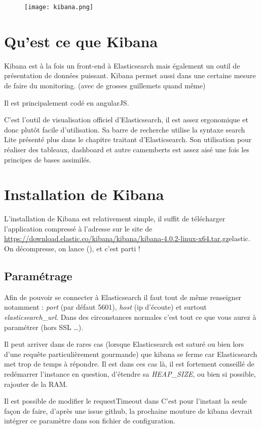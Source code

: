 \begin{figure}[H]
\center
\texttt{[image: kibana.png]}
\label{fig:kibana.png}
\end{figure}
\section{Qu'est ce que Kibana}
Kibana est à la fois un front-end à Elasticsearch mais également un outil de présentation
de données puissant. Kibana permet aussi dans une certaine mesure de faire du monitoring.
(avec de grosses guillemets quand même)

Il est principalement codé en angularJS.

C'est l'outil de visualisation officiel d'Elasticsearch, il est assez ergonomique 
et donc plutôt facile d'utilisation. Sa barre de recherche utilise la syntaxe 
search Lite présenté plus dans le chapitre traitant d'Elasticsearch.
Son utilisation pour réaliser des tableaux, dashboard et autre camemberts est assez
aisé une fois les principes de bases assimilés.

\section{Installation de Kibana}
L'installation de Kibana est relativement simple, il suffit de télécharger l'application
compressé à l'adresse sur le site de \url{https://download.elastic.co/kibana/kibana/kibana-4.0.2-linux-x64.tar.gz}{elastic}.
On décompresse, on lance (), et c'est parti !

\subsection{Paramétrage}
Afin de pouvoir se connecter à Elasticsearch il faut tout de même renseigner 
 notamment : \emph{port} (par défaut 5601), \emph{host} (ip d'écoute)
et surtout \emph{elasticsearch\_url}.
Dans des circonstances normales c'est tout ce que vous aurez à paramétrer (hors 
SSL \ldots{}).

Il peut arriver dans de rares cas (lorsque Elasticsearch est saturé ou bien lors 
d'une requête particulièrement gourmande) que kibana se ferme car Elasticsearch met
trop de temps à répondre. Il est dans ces cas là, il est fortement conseillé de 
redémarrer l'instance en question, d'étendre sa \emph{HEAP\_SIZE}, ou bien si possible, 
rajouter de la RAM.

Il est possible de modifier le requestTimeout dans 
C'est pour l'instant la seule façon de faire, d'après une issue github, la prochaine 
mouture de kibana devrait intégrer ce paramètre dans son fichier de configuration.


